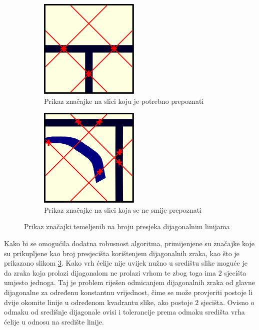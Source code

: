 \documentclass[times, utf8, zavrsni, numeric]{fer}
\begin{document}
\begin{figure}[th!]
    \centering
    \begin{subfigure}{.5\textwidth}
        \centering
        \includegraphics[width=.45\linewidth]{Images/Feature_true_3.png}
        \captionsetup{justification=centering}
        \caption{Prikaz značajke na slici koju je potrebno prepoznati}
        \label{fig:featureDemo3a}
    \end{subfigure}%
    \begin{subfigure}{.5\textwidth}
        \centering
        \includegraphics[width=.45\linewidth]{Images/Feature_false_3.png}
        \caption{Prikaz značajke na slici koja se ne smije prepoznati}
        \label{fig:featureDemo3b}
    \end{subfigure}
    \caption{Prikaz značajki temeljenih na broju presjeka dijagonalnim linijama}
    \label{fig:featureDemo3}
\end{figure}

Kako bi se omogućila dodatna robusnost algoritma, primijenjene su značajke koje su prikupljene kao broj presjecišta korištenjem dijagonalnih zraka, kao što je prikazano slikom \ref{fig:featureDemo3}.
Kako vrh ćelije nije uvijek nužno u središtu slike moguće je da zraka koja prolazi dijagonalom ne prolazi vrhom te zbog toga ima $2$ sjecišta umjesto jednoga.
Taj je problem riješen odmicanjem dijagonalnih zraka od glavne dijagonalne za određenu konstantnu vrijednost, čime se može provjeriti postoje li dvije okomite linije u određenom kvadrantu slike, ako postoje $2$ sjecišta.
Ovisno o odmaku od središnje dijagonale ovisi i tolerancije prema odmaku središta vrha ćelije u odnosu na središte linije.\\
\end{document}
